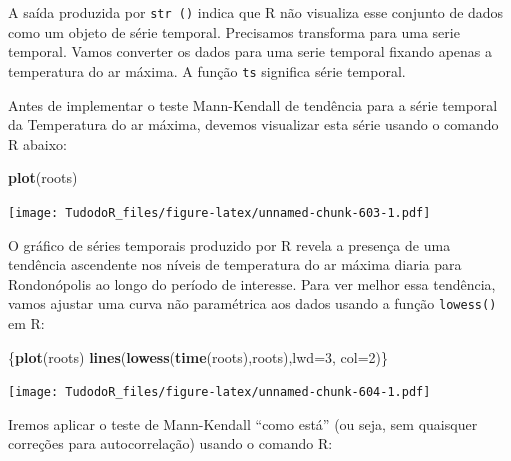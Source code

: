 \documentclass[
]{book}
\newenvironment{Shaded}{\begin{snugshade}}{\end{snugshade}}
\newcommand{\DataTypeTok}[1]{\textcolor[rgb]{0.13,0.29,0.53}{#1}}
\newcommand{\DecValTok}[1]{\textcolor[rgb]{0.00,0.00,0.81}{#1}}
\newcommand{\KeywordTok}[1]{\textcolor[rgb]{0.13,0.29,0.53}{\textbf{#1}}}
\newcommand{\NormalTok}[1]{#1}
\newcommand{\OperatorTok}[1]{\textcolor[rgb]{0.81,0.36,0.00}{\textbf{#1}}}
\begin{document}
A saída produzida por \texttt{str\ ()} indica que R não visualiza esse conjunto de dados como um objeto de série temporal. Precisamos transforma para uma serie temporal.
Vamos converter os dados para uma serie temporal fixando apenas a temperatura do ar máxima. A função \texttt{ts} significa série temporal.

\begin{Shaded}
\end{Shaded}

Antes de implementar o teste Mann-Kendall de tendência para a série temporal da Temperatura do ar máxima, devemos visualizar esta série usando o comando R abaixo:

\begin{Shaded}
\begin{Highlighting}[]
\KeywordTok{plot}\NormalTok{(roots)}
\end{Highlighting}
\end{Shaded}

\texttt{[image: TudodoR\_files/figure-latex/unnamed-chunk-603-1.pdf]}

O gráfico de séries temporais produzido por R revela a presença de uma tendência ascendente nos níveis de temperatura do ar máxima diaria para Rondonópolis ao longo do período de interesse. Para ver melhor essa tendência, vamos ajustar uma curva não paramétrica aos dados usando a função \texttt{lowess()} em R:

\begin{Shaded}
\begin{Highlighting}[]
\NormalTok{\{}\KeywordTok{plot}\NormalTok{(roots)}
\KeywordTok{lines}\NormalTok{(}\KeywordTok{lowess}\NormalTok{(}\KeywordTok{time}\NormalTok{(roots),roots),}\DataTypeTok{lwd=}\DecValTok{3}\NormalTok{, }\DataTypeTok{col=}\DecValTok{2}\NormalTok{)\}}
\end{Highlighting}
\end{Shaded}

\texttt{[image: TudodoR\_files/figure-latex/unnamed-chunk-604-1.pdf]}

Iremos aplicar o teste de Mann-Kendall ``como está'' (ou seja, sem quaisquer correções para autocorrelação) usando o comando R:
\end{document}
